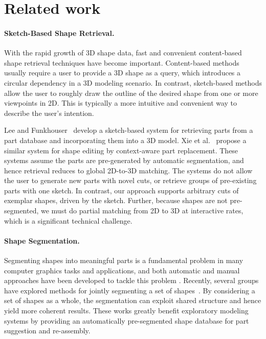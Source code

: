\section{Related work}

\paragraph*{Sketch-Based Shape Retrieval.} With the rapid growth of 3D shape data, fast and convenient content-based shape retrieval techniques \cite{asurveyofcontentbasedtangeldermultimedia2008} have become important. Content-based methods usually require a user to provide a 3D shape as a query, which introduces a circular dependency in a 3D modeling scenario. In contrast, sketch-based methods \cite{asearchenginefunkhousertog2003,discriminativesketchbasedshaotianjiacgf2011,EitRicBouHilAle12} allow the user to roughly draw the outline of the desired shape from one or more viewpoints in 2D. This is typically a more intuitive and convenient way to describe the user's intention.

Lee and Funkhouser~ develop a sketch-based system for retrieving parts from a part database and incorporating them into a 3D model. Xie et al.~ propose a similar system for shape editing by context-aware part replacement. These systems assume the parts are pre-generated by automatic segmentation, and hence retrieval reduces to global 2D-to-3D matching. The systems do not allow the user to generate new parts with novel cuts, or retrieve groups of pre-existing parts with one sketch. In contrast, our approach supports arbitrary cuts of exemplar shapes, driven by the sketch. Further, because shapes are not pre-segmented, we must do partial matching from 2D to 3D at interactive rates, which is a significant technical challenge.


\paragraph*{Shape Segmentation.} Segmenting shapes into meaningful parts is a fundamental problem in many computer graphics tasks and applications, and both automatic and manual approaches have been developed to tackle this problem \cite{surveyonmeshsegmentationshamircgf2008,benchmarkforsegmentationchenxiaobaisg2009}. Recently, several groups have explored methods for jointly segmenting a set of shapes~\cite{learning3dmeshsegmentationkalosg2010,cosegmentationof3dshapesliuligangcgf2012,jointshapesegmentationhuangqixingsg2011,SidKaiKleZhaCoh11}. By considering a set of shapes as a whole, the segmentation can exploit shared structure and hence yield more coherent results. These works greatly benefit exploratory modeling systems by providing an automatically pre-segmented shape database for part suggestion and re-assembly.

